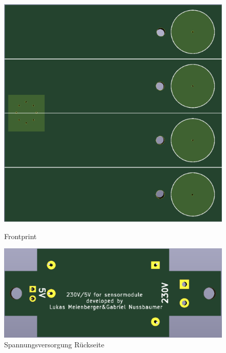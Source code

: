 \begin{figure}[H]
\begin{center}
\begin{minipage}[b]{.3\linewidth}
			\includegraphics[width=\textwidth]{graphics/Sensor3.PNG}
			\caption{Frontprint}
			\label{pic: Frontprint}
		\end{minipage}
	\hspace{.1\linewidth}%
		\begin{minipage}[b]{.3\linewidth} %
	\includegraphics[width=\textwidth]{graphics/Sensor2.PNG}
	\caption{Spannungsversorgung Rückseite}
	\label{pic: ruckseite}
\end{minipage}
\end{center}
\end{figure}

